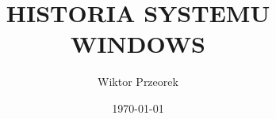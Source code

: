 \documentclass{beamer}
\title{HISTORIA SYSTEMU WINDOWS}
\author{Wiktor Przeorek}
\date{\today}
\begin{document}
\frame{\titlepage}










\end{document}
